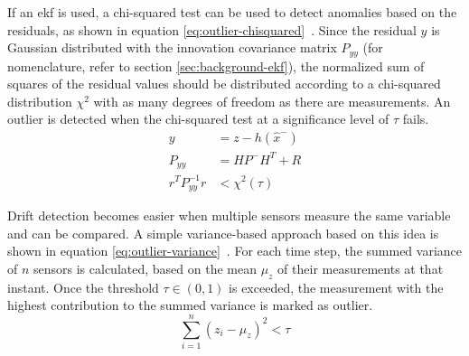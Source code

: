If an \gls{ekf} is used, a chi-squared test can be used to detect anomalies based on the residuals, as shown in equation \ref{eq:outlier-chisquared}~\cites[p.~4292]{Hausman.2016}[p.~2050~f.]{Valls.2018}. Since the residual $y$ is Gaussian distributed with the innovation covariance matrix $P_{yy}$ (for nomenclature, refer to section \ref{sec:background-ekf}), the normalized sum of squares of the residual values should be distributed according to a chi-squared distribution $\chi^2$ with as many degrees of freedom as there are measurements. An outlier is detected when the chi-squared test at a significance level of $\tau$ fails.
\begin{subequations}\label{eq:outlier-chisquared}
\begin{alignat}{2}%
y &= z - h(\hat{x}^-) \\%
P_{yy} &= H P^- H^T + R \\%
r^T P_{yy}^{-1} r &< \chi^2(\tau)%
\end{alignat}
\end{subequations}

Drift detection becomes easier when multiple sensors measure the same variable and can be compared. A simple variance-based approach based on this idea is shown in equation \ref{eq:outlier-variance}~\cite[p.~20]{Kabzan.2019}. For each time step, the summed variance of $n$ sensors is calculated, based on the mean $\mu_z$ of their measurements at that instant. Once the threshold $\tau \in (0, 1)$ is exceeded, the measurement with the highest contribution to the summed variance is marked as outlier.
\begin{equation}\label{eq:outlier-variance}%
\sum_{i=1}^n (z_i - \mu_z)^2 < \tau%
\end{equation}

